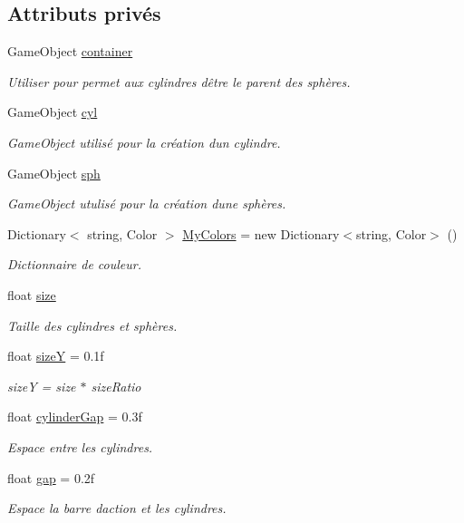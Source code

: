 \subsection*{Attributs privés}
\begin{DoxyCompactItemize}
\item 
Game\+Object \hyperlink{class_animation_a51ca87e758a25805ddb89216570653c0}{container}
\begin{DoxyCompactList}\small\item\em Utiliser pour permet aux cylindres d\textquotesingle{}être le parent des sphères. \end{DoxyCompactList}\item 
Game\+Object \hyperlink{class_animation_adbb047fab7576bbef43eaf793cf090a6}{cyl}
\begin{DoxyCompactList}\small\item\em Game\+Object utilisé pour la création d\textquotesingle{}un cylindre. \end{DoxyCompactList}\item 
Game\+Object \hyperlink{class_animation_af7fc2df5c0ddc866cdbe608f31642dee}{sph}
\begin{DoxyCompactList}\small\item\em Game\+Object utulisé pour la création d\textquotesingle{}une sphères. \end{DoxyCompactList}\item 
Dictionary$<$ string, Color $>$ \hyperlink{class_animation_a294f170c53019f262d91e616410ae09c}{My\+Colors} = new Dictionary$<$string, Color$>$ ()
\begin{DoxyCompactList}\small\item\em Dictionnaire de couleur. \end{DoxyCompactList}\item 
float \hyperlink{class_animation_a89c2ae66fd6defd82f2f3ff5f82b4f4d}{size}
\begin{DoxyCompactList}\small\item\em Taille des cylindres et sphères. \end{DoxyCompactList}\item 
float \hyperlink{class_animation_a989c075387e746acc254fe2eeb83fb4c}{size\+Y} = 0.\+1f
\begin{DoxyCompactList}\small\item\em size\+Y = size $\ast$ size\+Ratio \end{DoxyCompactList}\item 
float \hyperlink{class_animation_a1e2704aeb83ffa433ed8e35f684fd39d}{cylinder\+Gap} = 0.\+3f
\begin{DoxyCompactList}\small\item\em Espace entre les cylindres. \end{DoxyCompactList}\item 
float \hyperlink{class_animation_a9c85a94c8eab9de9fa561bde4bd5b93b}{gap} = 0.\+2f
\begin{DoxyCompactList}\small\item\em Espace la barre d\textquotesingle{}action et les cylindres. \end{DoxyCompactList}\end{DoxyCompactItemize}


